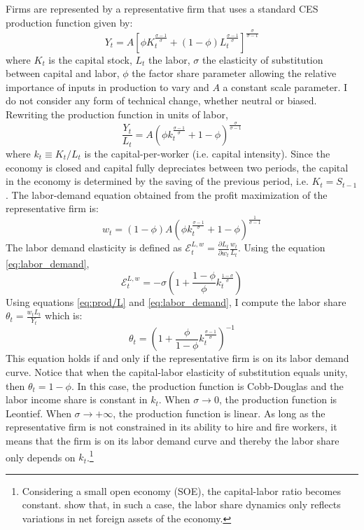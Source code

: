 Firms are represented by a representative firm that uses a standard CES production function given by:
\begin{equation}\label{eq:prod}
Y_t = A\left[ \phi K_t^{\frac{\sigma - 1}{\sigma}} + (1-\phi) L_t^{\frac{\sigma - 1}{\sigma}}\right]^{\frac{\sigma}{\sigma-1}}
\end{equation}
where $K_t$ is the capital stock, $L_t$ the labor, $\sigma$ the elasticity of substitution between capital and labor, $\phi$ the factor share parameter allowing the relative importance of inputs in production to vary and $A$ a constant scale parameter. I do not consider any form of technical change, whether neutral or biased. Rewriting the production function in units of labor,
\begin{equation}\label{eq:prod/L}
\frac{Y_t}{L_t} = A\left(\phi k_t^{\frac{\sigma-1}{\sigma}} + 1-\phi\right)^{\frac{\sigma}{\sigma-1}}
\end{equation}
where $k_t\equiv K_t/L_t$ is the capital-per-worker (i.e. capital intensity). Since the economy is closed and capital fully depreciates between two periods, the capital in the economy is determined by the saving of the previous period, i.e. $K_t = S_{t-1}$. The labor-demand equation obtained from the profit maximization of the representative firm is:
\begin{equation}\label{eq:labor_demand}
w_t = (1-\phi)A\left(\phi k_t^{\frac{\sigma-1}{\sigma}}+1-\phi\right)^{\frac{1}{\sigma-1}}
\end{equation}
The labor demand elasticity is defined as $\mathcal{E}^{L,w}_t=\frac{\partial L_t}{\partial w_t}\frac{w_t}{L_t}$. Using the equation \eqref{eq:labor_demand},
\begin{equation}\label{eq:labor_elasticity}
\mathcal{E}^{L,w}_t = -\sigma\left(1+\frac{1-\phi}{\phi}k_t^{\frac{1-\sigma}{\sigma}}\right)
\end{equation}
Using equations \eqref{eq:prod/L} and \eqref{eq:labor_demand}, I compute the labor share $\theta_t = \frac{w_tL_t}{Y_t}$ which is:
\begin{equation}\label{eq:theta}
\theta_t = \left(1+\frac{\phi}{1-\phi}k_t^{\frac{\sigma-1}{\sigma}}\right)^{-1}
\end{equation}
This equation holds if and only if the representative firm is on its labor demand curve. Notice that when the capital-labor elasticity of substitution equals unity, then $\theta_t=1-\phi$. In this case, the production function is Cobb-Douglas and the labor income share is constant in $k_t$.  When $\sigma \to 0$, the production function is Leontief. When $\sigma \to +\infty$, the production function is linear. 
As long as the representative firm is not constrained in its ability to hire and fire workers, it means that the firm is on its labor demand curve and thereby the labor share only depends on $k_t$.\footnote{Considering a small open economy (SOE), the capital-labor ratio becomes constant. \cite{Schmidt2013} show that, in such a case, the labor share dynamics only reflects variations in net foreign assets of the economy.}

